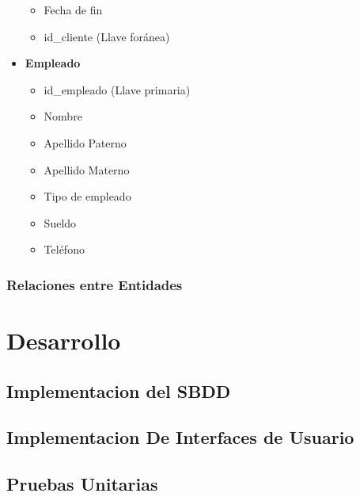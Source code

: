 \documentclass[spanish, 12pt]{article}
\providecommand{\tightlist}{\setlength{\itemsep}{0pt}
\setlength{\parskip}{0pt}}
\begin{document}
\begin{itemize}
\begin{itemize}
				\item Fecha de fin

				\item id\_cliente (Llave foránea)
			\end{itemize}

		\item \textbf{Empleado}

			\begin{itemize}
				\tightlist

				\item id\_empleado (Llave primaria)

				\item Nombre

				\item Apellido Paterno

				\item Apellido Materno

				\item Tipo de empleado

				\item Sueldo

				\item Teléfono
			\end{itemize}
	\end{itemize}

	\subsubsection{Relaciones entre Entidades}
	\label{relaciones-entre-entidades}

	\section{Desarrollo}
	\label{desarrollo}

	\subsection{Implementacion del SBDD}
	\label{implementacion-del-sbdd}

	\subsection{Implementacion De Interfaces de Usuario}
	\label{implementacion-de-interfaces-de-usuario}

	\subsection{Pruebas Unitarias}
	\label{pruebas-unitarias}
\end{document}
